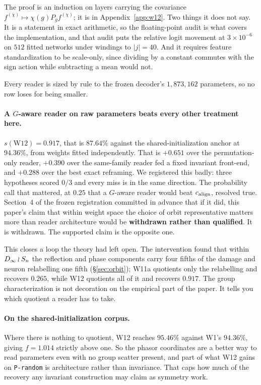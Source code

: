 The proof is an induction on layers carrying the covariance
$f^{(\chi)} \mapsto \chi(g) P_g f^{(\chi)}$; it is in Appendix~\ref{app:w12}. Two things it does not
say. It is a statement in exact arithmetic, so the floating-point audit is what covers the
implementation, and that audit puts the relative logit movement at $3\times10^{-6}$ on $512$ fitted
networks under windings to $|j| = 40$. And it requires feature standardization to be scale-only,
since dividing by a constant commutes with the sign action while subtracting a mean would not.

Every reader is sized by rule to the frozen decoder's $1{,}873{,}162$ parameters, so no row loses
for being smaller.



\paragraph{A $G$-aware reader on raw parameters beats every other treatment here.}
$s(\mathrm{W12}) = \mathbf{0.917}$, that is $87.64\%$ against the shared-initialization anchor at
$94.36\%$, from weights fitted independently. That is $+0.651$ over the permutation-only reader,
$+0.390$ over the same-family reader fed a fixed invariant front-end, and $+0.288$ over the best
exact reframing. We registered this badly: three hypotheses scored $0/3$ and every miss is in the
same direction. The probability call that mattered, at $0.25$ that a $G$-aware reader would beat
$c_{\mathrm{align}}$, resolved true. Section~4 of the frozen registration committed in advance that if it did,
this paper's claim that within weight space the choice of orbit representative matters more than
reader architecture would be \textbf{withdrawn rather than qualified}. It is withdrawn. The
supported claim is the opposite one.

This closes a loop the theory had left open. The intervention found that within $D_\infty\wr S_n$ the
reflection and phase components carry four fifths of the damage and neuron relabelling one fifth
(\S\ref{sec:orbit}); W11a quotients only the relabelling and recovers $0.265$, while W12 quotients
all of it and recovers $0.917$. The group characterization is not decoration on the empirical part
of the paper. It tells you which quotient a reader has to take.

\paragraph{On the shared-initialization corpus.} Where there is nothing to quotient, W12 reaches
$95.46\%$ against W1's $94.36\%$, giving $f = 1.014$ strictly above one. So the phasor coordinates
are a better way to read parameters even with no group scatter present, and part of what W12 gains
on \texttt{P-random} is architecture rather than invariance. That caps how much of the recovery any
invariant construction may claim as symmetry work.

